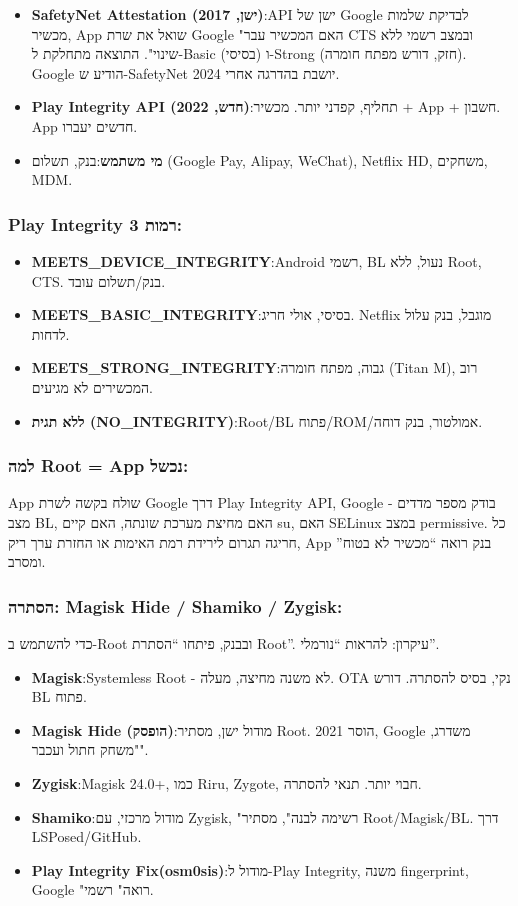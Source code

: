\begin{itemize}
  \item \textbf{SafetyNet Attestation (ישן, 2017)}:API ישן של Google לבדיקת שלמות מכשיר, App שואל את שרת Google "האם המכשיר עבר CTS ובמצב רשמי ללא שינוי". התוצאה מתחלקת ל-Basic (בסיסי) ו-Strong (חזק, דורש מפתח חומרה). Google הודיע ש-SafetyNet יושבת בהדרגה אחרי 2024.
  \item \textbf{Play Integrity API (חדש, 2022)}:תחליף, קפדני יותר. מכשיר + App + חשבון. App חדשים יעברו.
  \item \textbf{מי משתמש}:בנק, תשלום (Google Pay, Alipay, WeChat), Netflix HD, משחקים, MDM.
\end{itemize}

\subsubsection*{Play Integrity 3 רמות:}

\begin{itemize}
  \item \textbf{MEETS\_DEVICE\_INTEGRITY}:Android רשמי, BL נעול, ללא Root, CTS. בנק/תשלום עובד.
  \item \textbf{MEETS\_BASIC\_INTEGRITY}:בסיסי, אולי חריג. Netflix מוגבל, בנק עלול לדחות.
  \item \textbf{MEETS\_STRONG\_INTEGRITY}:גבוה, מפתח חומרה (Titan M), רוב המכשירים לא מגיעים.
  \item \textbf{ללא תגית (NO\_INTEGRITY)}:Root/BL פתוח/ROM/אמולטור, בנק דוחה.
\end{itemize}

\subsubsection*{למה Root = App נכשל:}

App שולח בקשה לשרת Google דרך Play Integrity API, Google בודק מספר מדדים - מצב BL, האם מחיצת מערכת שונתה, האם קיים su, האם SELinux במצב permissive. כל חריגה תגרום לירידת רמת האימות או החזרת ערך ריק, App בנק רואה “מכשיר לא בטוח” ומסרב.

\subsubsection*{הסתרה: Magisk Hide / Shamiko / Zygisk:}

כדי להשתמש ב-Root ובבנק, פיתחו “הסתרת Root”. עיקרון: להראות “נורמלי”.

\begin{itemize}
  \item \textbf{Magisk}:Systemless Root - לא משנה מחיצה, מעלה. OTA נקי, בסיס להסתרה. דורש BL פתוח.
  \item \textbf{Magisk Hide (הופסק)}:מודול ישן, מסתיר Root. 2021 הוסר, Google משדרג, "משחק חתול ועכבר".
  \item \textbf{Zygisk}:Magisk 24.0+, כמו Riru, Zygote, חבוי יותר. תנאי להסתרה.
  \item \textbf{Shamiko}:מודול מרכזי, עם Zygisk, "רשימה לבנה", מסתיר Root/Magisk/BL. דרך LSPosed/GitHub.
  \item \textbf{Play Integrity Fix(osm0sis)}:מודול ל-Play Integrity, משנה fingerprint, Google "רואה" רשמי.
\end{itemize}

